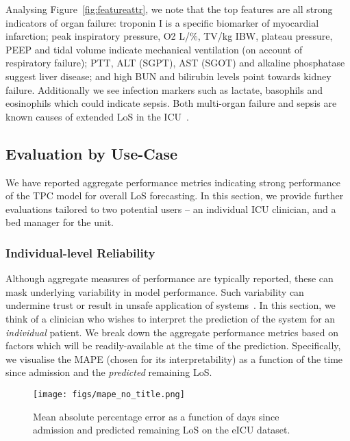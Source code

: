 \documentclass[sigconf]{acmart}
\begin{document}
Analysing Figure~\ref{fig:featureattr}, we note that the top features are all strong indicators of organ failure: troponin I is a specific biomarker of myocardial infarction; peak inspiratory pressure, O2 L/\%, TV/kg IBW, plateau pressure, PEEP and tidal volume indicate mechanical ventilation (on account of respiratory failure); PTT, ALT (SGPT), AST (SGOT) and alkaline phosphatase suggest liver disease; and high BUN and bilirubin levels point towards kidney failure. Additionally we see infection markers such as lactate, basophils and eosinophils which could indicate sepsis. Both multi-organ failure and sepsis are known causes of extended LoS in the ICU~\citep{Bohmer2014}.

\subsection{Evaluation by Use-Case}
We have reported aggregate performance metrics indicating strong performance of the TPC model for overall LoS forecasting. In this section, we provide further evaluations tailored to two potential users -- an individual ICU clinician, and a bed manager for the unit.

\subsubsection{Individual-level Reliability}

Although aggregate measures of performance are typically reported, these can mask underlying variability in model performance. Such variability can undermine trust or result in unsafe application of systems~\cite{Sendak2020}. In this section, we think of a clinician who wishes to interpret the prediction of the system for an \emph{individual} patient. We break down the aggregate performance metrics based on factors which will be readily-available at the time of the prediction. Specifically, we visualise the MAPE (chosen for its interpretability) as a function of the time since admission and the \emph{predicted} remaining LoS.

\begin{figure}[h]
  \centering
\texttt{[image: figs/mape\_no\_title.png]}
  \caption{Mean absolute percentage error as a function of days since admission and predicted remaining LoS on the eICU dataset.}
    \label{fig:reliability}
\end{figure}
\end{document}
